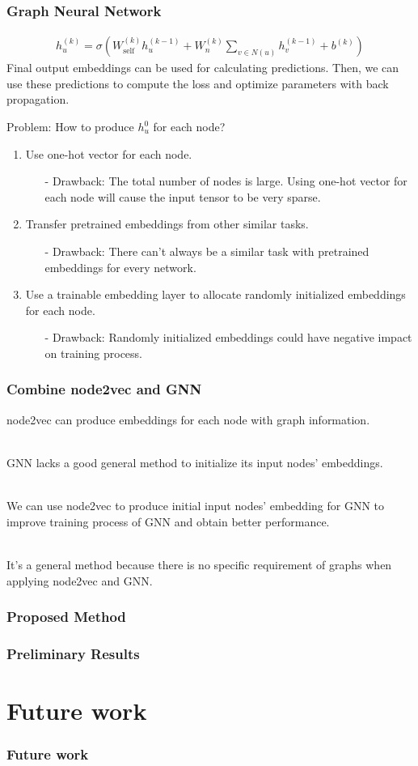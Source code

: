\documentclass[10pt, aspectratio=169]{beamer}
\begin{document}
\begin{frame}
    \frametitle{Graph Neural Network}
    \begin{align*}
        \displaystyle
        h_u^{(k)} = \sigma( W_{\text{self}}^{(k)} h_u^{(k-1)} + W_n^{(k)}\sum_{v\in N(u)} h_v^{(k-1)} + b^{(k)} ) 
    \end{align*}
    Final output embeddings can be used for calculating predictions. Then, we can use these predictions to compute the loss and optimize parameters with back propagation.\par \vspace{0.2cm}\pause
    Problem: How to produce $h_u^0$ for each node?
    \begin{enumerate}
        \item Use one-hot vector for each node.
            \begin{itemize}
                \item[-] Drawback: The total number of nodes is large. Using one-hot vector for each node will cause the input tensor to be very sparse.
            \end{itemize} 
        \item<3-> Transfer pretrained embeddings from other similar tasks.
            \begin{itemize}
                \item[-] Drawback: There can't always be a similar task with pretrained embeddings for every network.
            \end{itemize}
        \item<4-> Use a trainable embedding layer to allocate randomly initialized embeddings for each node.
            \begin{itemize}
                \item[-] Drawback: Randomly initialized embeddings could have negative impact on training process.
            \end{itemize}
    \end{enumerate}
\end{frame}

\begin{frame}
    \frametitle{Combine node2vec and GNN}
    node2vec can produce embeddings for each node with graph information.\par ~\\
    GNN lacks a good general method to initialize its input nodes’ embeddings.\par ~\\
    We can use node2vec to produce initial input nodes’ embedding for GNN to improve training process of GNN and obtain better performance.\par ~\\
    It’s a general method because there is no specific requirement of graphs when applying node2vec and GNN.
\end{frame}

\begin{frame}
    \frametitle{Proposed Method}
\end{frame}

\begin{frame}
    \frametitle{Preliminary Results}
\end{frame}

\section{Future work}
\begin{frame}
    \frametitle{Future work} 
\end{frame}
\end{document}
